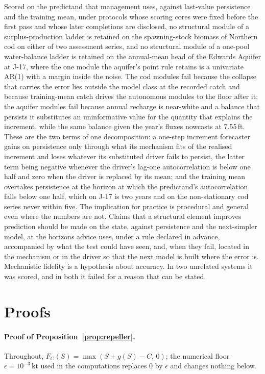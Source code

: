 \documentclass[preprint,11pt,authoryear]{elsarticle}
\theoremstyle{definition}
\theoremstyle{remark}
\newcommand{\kt}{\,\mathrm{kt}}
\begin{document}
Scored on the predictand that management uses, against last-value persistence and the training mean, under protocols whose scoring cores were fixed before the first pass and whose later completions are disclosed, no structural module of a surplus-production ladder is retained on the spawning-stock biomass of Northern cod on either of two assessment series, and no structural module of a one-pool water-balance ladder is retained on the annual-mean head of the Edwards Aquifer at J-17, where the one module the aquifer's point rule retains is a univariate AR(1) with a margin inside the noise. The cod modules fail because the collapse that carries the error lies outside the model class at the recorded catch and because training-mean catch drives the autonomous modules to the floor after it; the aquifer modules fail because annual recharge is near-white and a balance that persists it substitutes an uninformative value for the quantity that explains the increment, while the same balance given the year's fluxes nowcasts at 7.55\,ft. These are the two terms of one decomposition: a one-step increment forecaster gains on persistence only through what its mechanism fits of the realised increment and loses whatever its substituted driver fails to persist, the latter term being negative whenever the driver's lag-one autocorrelation is below one half and zero when the driver is replaced by its mean; and the training mean overtakes persistence at the horizon at which the predictand's autocorrelation falls below one half, which on J-17 is two years and on the non-stationary cod series never within five. The implication for practice is procedural and general even where the numbers are not. Claims that a structural element improves prediction should be made on the state, against persistence and the next-simpler model, at the horizons advice uses, under a rule declared in advance, accompanied by what the test could have seen, and, when they fail, located in the mechanism or in the driver so that the next model is built where the error is. Mechanistic fidelity is a hypothesis about accuracy. In two unrelated systems it was scored, and in both it failed for a reason that can be stated.
\appendix
\FloatBarrier
\section{Proofs}\label{app:proofs}

\paragraph{Proof of Proposition~\ref{prop:repeller}.} Throughout, $F_C(S) = \max(S + g(S) - C,\,0)$; the numerical floor $\epsilon = 10^{-3}\kt$ used in the computations replaces $0$ by $\epsilon$ and changes nothing below.
\end{document}
